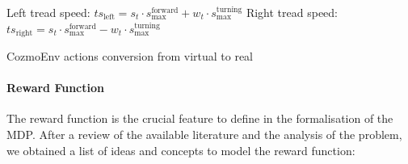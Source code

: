 \begin{algorithm}[!h]
    \SetAlgoLined
    \small
    \DontPrintSemicolon
    \LinesNumbered

    Left tread speed: $ts_{\text{left}} = s_t \cdot s^{\text{forward}}_{\text{max}} + w_t \cdot s^{\text{turning}}_{\text{max}}$\;
    Right tread speed: $ts_{\text{right}} = s_t \cdot s^{\text{forward}}_{\text{max}} - w_t \cdot s^{\text{turning}}_{\text{max}}$

    \caption{CozmoEnv actions conversion from virtual to real}
    \label{conversionCozmoEnv}
\end{algorithm}


\paragraph{Reward Function}

The reward function is the crucial feature to define in the formalisation of the MDP.
After a review of the available literature and the analysis of the problem, we obtained a list of ideas and concepts to model the reward function:

